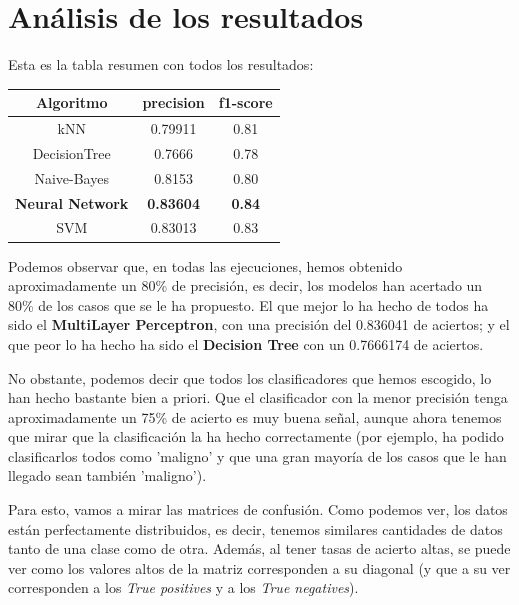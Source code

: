\documentclass[11pt,a4paper]{article}
\begin{document}
\newpage
\section{Análisis de los resultados}
Esta es la tabla resumen con todos los resultados:
\begin{table}[H]
\centering
    \begin{tabular}{|c|c|c|}
        \hline
        \textbf{Algoritmo} & \textbf{precision} & \textbf{f1-score} \\ \hline
        kNN & 0.79911 & 0.81 \\ \hline
        DecisionTree & 0.7666 & 0.78 \\ \hline
        Naive-Bayes & 0.8153 & 0.80 \\ \hline
        \textbf{Neural Network} & \textbf{0.83604} & \textbf{0.84} \\ \hline
        SVM & 0.83013 & 0.83 \\ \hline
    \end{tabular}
\end{table}

Podemos observar que, en todas las ejecuciones, hemos obtenido aproximadamente un 80\% de precisión, es decir, los modelos
han acertado un 80\% de los casos que se le ha propuesto. El que mejor lo ha hecho de todos ha sido el \textbf{MultiLayer
Perceptron}, con una precisión del 0.836041 de aciertos; y el que peor lo ha hecho ha sido el \textbf{Decision Tree} con un
0.7666174 de aciertos.

No obstante, podemos decir que todos los clasificadores que hemos escogido, lo han hecho bastante bien a priori. Que el
clasificador con la menor precisión tenga aproximadamente un 75\% de acierto es muy buena señal, aunque ahora tenemos que
mirar que la clasificación la ha hecho correctamente (por ejemplo, ha podido clasificarlos todos como 'maligno' y que una
gran mayoría de los casos que le han llegado sean también 'maligno').

Para esto, vamos a mirar las matrices de confusión. Como podemos ver, los datos están perfectamente distribuidos, es decir,
tenemos similares cantidades de datos tanto de una clase como de otra. Además, al tener tasas de acierto altas, se puede ver
como los valores altos de la matriz corresponden a su diagonal (y que a su ver corresponden a los \textit{True positives} y
a los \textit{True negatives}).
\end{document}
